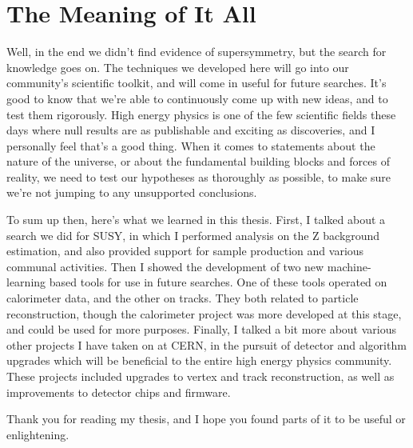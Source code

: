 \chapter{The Meaning of It All}

Well, in the end we didn't find evidence of supersymmetry, but the search for knowledge goes on. The techniques we developed here will go into our community's scientific toolkit, and will come in useful for future searches. It's good to know that we're able to continuously come up with new ideas, and to test them rigorously. High energy physics is one of the few scientific fields these days where null results are as publishable and exciting as discoveries, and I personally feel that's a good thing. When it comes to statements about the nature of the universe, or about the fundamental building blocks and forces of reality, we need to test our hypotheses as thoroughly as possible, to make sure we're not jumping to any unsupported conclusions.

To sum up then, here's what we learned in this thesis. First, I talked about a search we did for SUSY, in which I performed analysis on the Z background estimation, and also provided support for sample production and various communal activities. Then I showed the development of two new machine-learning based tools for use in future searches. One of these tools operated on calorimeter data, and the other on tracks. They both related to particle reconstruction, though the calorimeter project was more developed at this stage, and could be used for more purposes. Finally, I talked a bit more about various other projects I have taken on at CERN, in the pursuit of detector and algorithm upgrades which will be beneficial to the entire high energy physics community. These projects included upgrades to vertex and track reconstruction, as well as improvements to detector chips and firmware.

Thank you for reading my thesis, and I hope you found parts of it to be useful or enlightening.